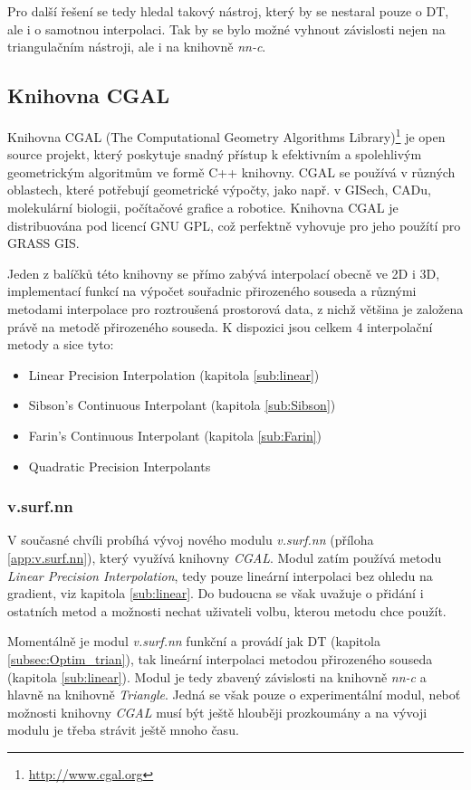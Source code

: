 \documentclass[12pt,a4paper]{article}
\begin{document}
Pro další řešení se tedy hledal takový nástroj, který by se nestaral
pouze o DT, ale i o samotnou interpolaci. Tak by se bylo možné vyhnout
závislosti nejen na triangulačním nástroji, ale i na knihovně
\emph{nn-c}.

\newpage
\subsection{Knihovna CGAL}
Knihovna CGAL (The Computational Geometry Algorithms
Library)\footnote{\url{http://www.cgal.org}} je open source projekt, který
poskytuje snadný přístup k efektivním a spolehlivým geometrickým
algoritmům ve formě C++ knihovny. CGAL se používá v různých oblastech,
které potřebují geometrické výpočty, jako např. v GISech, CADu,
molekulární bio\-logii, počítačové grafice a robotice. Knihovna CGAL je
distribuována pod licencí GNU GPL, což perfektně vyhovuje pro jeho
použítí pro GRASS GIS.

Jeden z balíčků této knihovny se přímo zabývá interpolací obecně ve 2D
i 3D, implementací funkcí na výpočet souřadnic přirozeného souseda a
různými metodami interpolace pro roztroušená prostorová data, z nichž
většina je založena právě na metodě přirozeného souseda. K dispozici
jsou celkem 4 interpolační metody a sice tyto:
\begin{itemize}
\item Linear Precision Interpolation (kapitola \ref{sub:linear})
\item Sibson's Continuous Interpolant (kapitola \ref{sub:Sibson})
\item Farin's Continuous Interpolant (kapitola \ref{sub:Farin})
\item Quadratic Precision Interpolants
\end{itemize}

\subsubsection{v.surf.nn}
\label{subsub:v.surf.nn}
V současné chvíli probíhá vývoj nového modulu \emph{v.surf.nn} (příloha \ref{app:v.surf.nn}), který
využívá knihovny \emph{CGAL}. Modul zatím používá metodu \emph{Linear Precision
Interpolation}, tedy pouze lineární interpolaci bez ohledu na gradient, viz kapitola \ref{sub:linear}. Do budoucna se
však uvažuje o přidání i ostatních metod a možnosti nechat uživateli volbu,
kterou metodu chce použít.

Momentálně je modul \emph{v.surf.nn} funkční a provádí jak DT (kapitola \ref{subsec:Optim_trian}),
tak lineární interpolaci metodou přirozeného souseda (kapitola \ref{sub:linear}).
Modul je tedy zbavený závislosti na knihovně \emph{nn-c} a hlavně na knihovně \emph{Triangle}.
Jedná se však pouze o experimentální modul, neboť možnosti knihovny \emph{CGAL} musí být ještě hlouběji prozkoumány a na vývoji modulu je třeba strávit ještě mnoho času.
\end{document}

